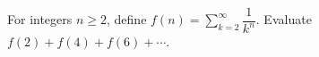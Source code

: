 For integers $n\ge2$, define $f(n)=\sum_{k=2}^{\infty}\dfrac{1}{k^n}$. Evaluate $f(2)+f(4)+f(6)+\cdots$.
